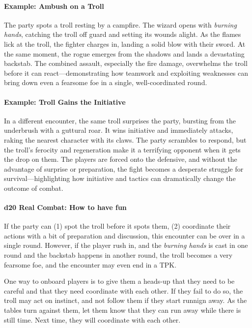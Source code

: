 \documentclass[twocolumn]{dndbook}
\begin{document}
\paragraph*{Example: Ambush on a Troll}
The party spots a troll resting by a campfire. The wizard opens with \emph{burning hands},
catching the troll off guard and setting its wounds alight. As the flames lick at the troll,
the fighter charges in, landing a solid blow with their sword. At the same moment, the rogue
emerges from the shadows and lands a devastating backstab. The combined assault, especially the
fire damage, overwhelms the troll before it can react—demonstrating how teamwork and exploiting
weaknesses can bring down even a fearsome foe in a single, well-coordinated round.\par

\paragraph*{Example: Troll Gains the Initiative}
In a different encounter, the same troll surprises the party, bursting from the
underbrush with a guttural roar. It wins initiative and immediately attacks,
raking the nearest character with its claws. The party scrambles to respond,
but the troll’s ferocity and regeneration make it a terrifying opponent when
it gets the drop on them. The players are forced onto the defensive, and without the
advantage of surprise or preparation, the fight becomes a desperate struggle for
survival—highlighting how initiative and tactics can dramatically change the outcome of combat.\par


\paragraph*{d20 Real Combat: How to have fun}
If the party can (1) spot the troll before it spots them, (2) coordinate their actions with
a bit of preparation and discussion, this encounter can be over in a single round.
However, if the player rush in, and the \emph{burning hands} is cast in one
round and the backstab happens in another round, the troll becomes a very fearsome
foe, and the encounter may even end in a TPK.\par

One way to onboard players is to give them a heads-up that they need to be careful
and that they need coordinate with each other. If they fail to do so, the troll
may act on instinct, and not follow them if they start runnign away. As the tables turn against them,
let them know that they can run away while there is still time. Next time, they
will coordinate with each other.\par
\end{document}
